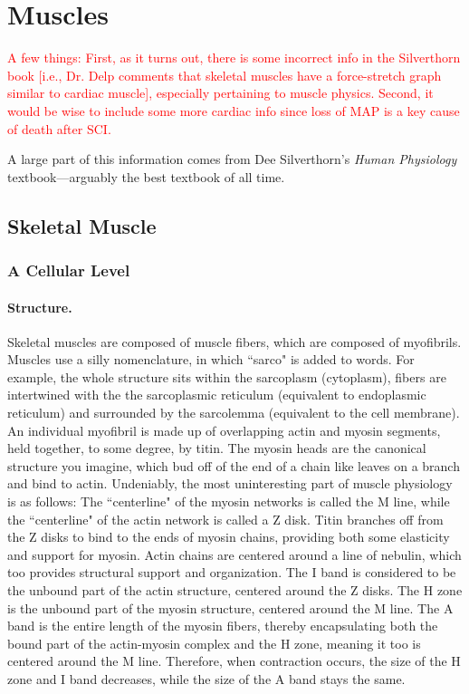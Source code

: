 \chapter{Muscles}

\textcolor{red}{A few things: First, as it turns out, there is some incorrect info in the Silverthorn book [i.e., Dr. Delp comments that skeletal muscles have a force-stretch graph similar to cardiac muscle], especially pertaining to muscle physics. Second, it would be wise to include some more cardiac info since loss of MAP is a key cause of death after SCI.}\newline

A large part of this information comes from Dee Silverthorn's \textit{Human Physiology} textbook---arguably the best textbook of all time. 

\section{Skeletal Muscle}
\subsection{A Cellular Level}
\subsubsection{Structure.}
Skeletal muscles are composed of muscle fibers, which are composed of myofibrils. Muscles use a silly nomenclature, in which ``sarco" is added to words. For example, the whole structure sits within the sarcoplasm (cytoplasm), fibers are intertwined with the the sarcoplasmic reticulum (equivalent to endoplasmic reticulum) and surrounded by the sarcolemma (equivalent to the cell membrane). An individual myofibril is made up of overlapping actin and myosin segments, held together, to some degree, by titin. The myosin heads are the canonical structure you imagine, which bud off of the end of a chain like leaves on a branch and bind to actin. Undeniably, the most uninteresting part of muscle physiology is as follows: The ``centerline" of the myosin networks is called the M line, while the ``centerline" of the actin network is called a Z disk. Titin branches off from the Z disks to bind to the ends of myosin chains, providing both some elasticity and support for myosin. Actin chains are centered around a line of nebulin, which too provides structural support and organization. The I band is considered to be the unbound part of the actin structure, centered around the Z disks. The H zone is the unbound part of the myosin structure, centered around the M line. The A band is the entire length of the myosin fibers, thereby encapsulating both the bound part of the actin-myosin complex and the H zone, meaning it too is centered around the M line. Therefore, when contraction occurs, the size of the H zone and I band decreases, while the size of the A band stays the same.

